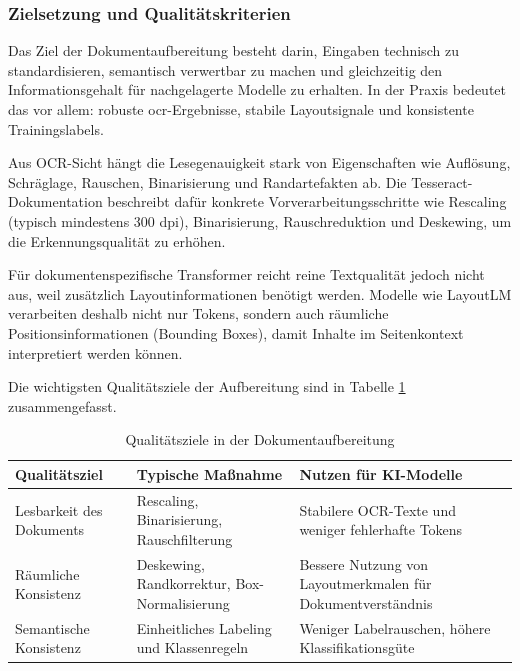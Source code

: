 \subsubsection{Zielsetzung und Qualitätskriterien}

Das Ziel der Dokumentaufbereitung besteht darin, Eingaben technisch zu standardisieren, semantisch verwertbar zu machen und gleichzeitig den Informationsgehalt für nachgelagerte Modelle zu erhalten. 
In der Praxis bedeutet das vor allem: robuste \acrshort{ocr}-Ergebnisse, stabile Layoutsignale und konsistente Trainingslabels. \cite{shaip2025dokumentenklassifizierung}

Aus OCR-Sicht hängt die Lesegenauigkeit stark von Eigenschaften wie Auflösung, Schräglage, Rauschen, Binarisierung und Randartefakten ab. 
Die Tesseract-Dokumentation beschreibt dafür konkrete Vorverarbeitungsschritte wie Rescaling (typisch mindestens 300 dpi), Binarisierung, Rauschreduktion und Deskewing, um die Erkennungsqualität zu erhöhen. \cite{tesseract_improve_quality}

Für dokumentenspezifische Transformer reicht reine Textqualität jedoch nicht aus, weil zusätzlich Layoutinformationen benötigt werden. 
Modelle wie LayoutLM verarbeiten deshalb nicht nur Tokens, sondern auch räumliche Positionsinformationen (Bounding Boxes), damit Inhalte im Seitenkontext interpretiert werden können. \cite{layoutlm_2020} \cite{huggingface_layoutlm}

Die wichtigsten Qualitätsziele der Aufbereitung sind in Tabelle \ref{tab:preprocessing_qualitaetsziele} zusammengefasst.

\begin{table}[h]
\centering
\caption{Qualitätsziele in der Dokumentaufbereitung \cite{tesseract_improve_quality} \cite{layoutlm_2020}}
\label{tab:preprocessing_qualitaetsziele}
\begin{tabular}{p{4cm} p{5cm} p{5cm}}
\textbf{Qualitätsziel} & \textbf{Typische Maßnahme} & \textbf{Nutzen für KI-Modelle} \\ \hline

Lesbarkeit des Dokuments &
Rescaling, Binarisierung, Rauschfilterung &
Stabilere OCR-Texte und weniger fehlerhafte Tokens \\ \hline

Räumliche Konsistenz &
Deskewing, Randkorrektur, Box-Normalisierung &
Bessere Nutzung von Layoutmerkmalen für Dokumentverständnis \\ \hline

Semantische Konsistenz &
Einheitliches Labeling und Klassenregeln &
Weniger Labelrauschen, höhere Klassifikationsgüte \\ \hline

\end{tabular}
\end{table}

